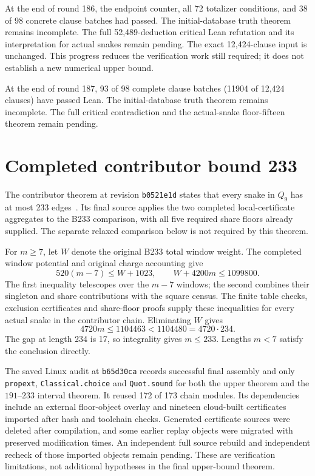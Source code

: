 \documentclass[11pt,a4paper]{article}
\theoremstyle{definition}
\theoremstyle{remark}
\begin{document}
At the end of round 186, the endpoint counter, all 72 totalizer conditions, and 38 of 98 concrete clause batches had passed. The initial-database truth theorem remains incomplete.
The full 52,489-deduction critical Lean refutation and its interpretation
for actual snakes remain pending. The exact 12,424-clause input is
unchanged. This progress reduces the verification work still required;
it does not establish a new numerical upper bound.

At the end of round 187, 93 of 98 complete clause batches (11904 of 12,424 clauses) have passed Lean. The initial-database truth theorem remains incomplete. The full critical contradiction and the actual-snake floor-fifteen theorem remain pending.

\section{Completed contributor bound 233}\label{sec:bound233}
The contributor theorem at revision \texttt{b0521e1d} states that every
snake in $Q_9$ has at most 233 edges~\cite{bound233archive}. Its final source
applies the two completed local-certificate aggregates to the B233
comparison, with all five required share floors already supplied.
The separate relaxed comparison below is not required by this theorem.

For $m\ge7$, let $W$ denote the original B233 total window weight.
The completed window potential and original charge accounting give
\[
520(m-7)\le W+1023,\qquad W+4200m\le1099800.
\]
The first inequality telescopes over the $m-7$ windows; the second
combines their singleton and share contributions with the square census.
The finite table checks, exclusion certificates and share-floor proofs
supply these inequalities for every actual snake in the contributor chain.
Eliminating $W$ gives
\[
4720m\le1104463<1104480=4720\cdot234.
\]
The gap at length 234 is 17, so integrality gives $m\le233$.
Lengths $m<7$ satisfy the conclusion directly.

The saved Linux audit at \texttt{b65d30ca} records successful final
assembly and only \texttt{propext}, \texttt{Classical.choice} and
\texttt{Quot.sound} for both the upper theorem and the $191$--$233$
interval theorem. It reused 172 of 173 chain modules. Its dependencies
include an external floor-object overlay and nineteen cloud-built
certificates imported after hash and toolchain checks. Generated
certificate sources were deleted after compilation, and some earlier
replay objects were migrated with preserved modification times.
An independent full source rebuild and independent recheck of those
imported objects remain pending. These are verification limitations,
not additional hypotheses in the final upper-bound theorem.
\end{document}
